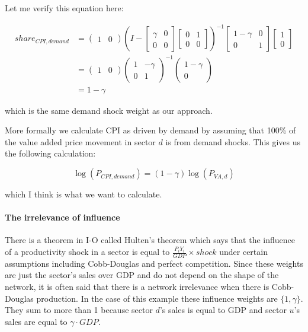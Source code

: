 \documentclass[12pt,english]{article}
\begin{document}
Let me verify this equation here:

\begin{align*}
	share_{CPI,demand}&=\begin{pmatrix}
		1 & 0
	\end{pmatrix}\left(I - \begin{bmatrix}
		\gamma &0\\0&0
	\end{bmatrix}\begin{bmatrix}
		0 &1\\0&0
	\end{bmatrix}\right)^{-1} \begin{bmatrix}
		1-\gamma &0\\0&1
	\end{bmatrix}\begin{bmatrix}
		1\\0
	\end{bmatrix}\\
	&=\begin{pmatrix}
		1 & 0
	\end{pmatrix}\begin{pmatrix}
		1 & -\gamma\\
		0 &1
	\end{pmatrix}^{-1}\begin{pmatrix}
		1-\gamma\\
		0
	\end{pmatrix}\\
	&=1-\gamma
\end{align*}

which is the same demand shock weight as our approach.

More formally we calculate CPI as driven by demand by assuming that 100\% of the value added price movement in sector $d$ is from demand shocks. This gives us the following calculation:

\[
	\log(P_{CPI,demand}) = (1-\gamma) \log(P_{VA,d})
\]

which I think is what we want to calculate.


\paragraph{The irrelevance of influence}
There is a theorem in I-O called Hulten's theorem which says that the influence of a productivity shock in a sector is equal to $\frac{P_iY_i}{GDP} \times shock$ under certain assumptions including Cobb-Douglas and perfect competition. Since these weights are just the sector's sales over GDP and do not depend on the shape of the network, it is often said that there is a network irrelevance when there is Cobb-Douglas production. In the case of this example these influence weights are $\{1,\gamma\}$. They sum to more than 1 because sector $d$'s sales is equal to GDP and sector $u$'s sales are equal to $\gamma\cdot GDP$. 
\end{document}
